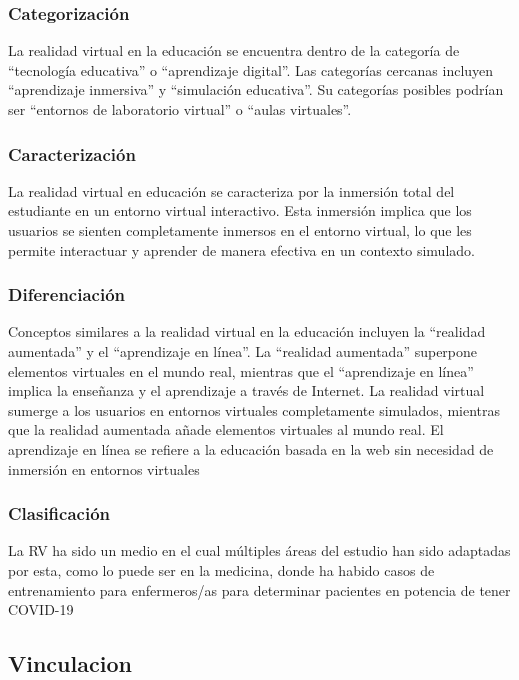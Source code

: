 \subsubsection{Categorización}

La realidad virtual en la educación se encuentra dentro de la categoría de “tecnología educativa” o “aprendizaje digital”. Las categorías cercanas incluyen “aprendizaje inmersiva” y “simulación educativa”. Su categorías posibles podrían ser “entornos de laboratorio virtual” o “aulas virtuales”.

\subsubsection{Caracterización}

La realidad virtual en educación se caracteriza por la inmersión total del estudiante en un entorno virtual interactivo. Esta inmersión implica que los usuarios se sienten completamente inmersos en el entorno virtual, lo que les permite interactuar y aprender de manera efectiva en un contexto simulado.

\subsubsection{Diferenciación}

Conceptos similares a la realidad virtual en la educación incluyen la “realidad aumentada” y el “aprendizaje en línea”. La “realidad aumentada” superpone elementos virtuales en el mundo real, mientras que el “aprendizaje en línea” implica la enseñanza y el aprendizaje a través de Internet. La realidad virtual sumerge a los usuarios en entornos virtuales completamente simulados, mientras que la realidad aumentada añade elementos virtuales al mundo real. El aprendizaje en línea se refiere a la educación basada en la web sin necesidad de inmersión en entornos virtuales \parencite{garcia2020}

\subsubsection{Clasificación}

La RV ha sido un medio en el cual múltiples áreas del estudio han sido adaptadas por esta, como lo puede ser en la medicina, donde ha habido casos de entrenamiento para enfermeros/as para determinar pacientes en potencia de tener COVID-19 \parencite{GUERRERO2022100002}

\subsection{Vinculacion}


